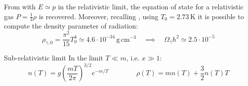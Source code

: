 From  with $ E \simeq p $ in the relativistic limit, the equation of state for a relativistic gas $ P = \frac{1}{3} \rho $ is recovered. Moreover, recalling , using $ T_0 = 2.73 \,\text{K} $ it is possible to compute the density parameter of radiation:
\begin{equation*}
  \rho_{\gamma,0} = \frac{\pi^2}{15} T_0^4 \simeq 4.6 \cdot 10^{-34} \,\text{g} \,\text{cm}^{-3}
  \quad \implies \quad
  \Omega_\gamma h^2 \simeq 2.5 \cdot 10^{-5}
\end{equation*}

\begin{lemma}{Sub-relativistic limit}{}
  In the limit $ T \ll m $, i.e. $ x \gg 1 $:
  \begin{equation}
    n(T) = g \left( \frac{m T}{2\pi} \right)^{3/2} e^{-m/T}
    \qquad \qquad
    \rho(T) = m n(T) + \frac{3}{2} n(T) T
    \label{eq:sub-rel}
  \end{equation}
\end{lemma}

